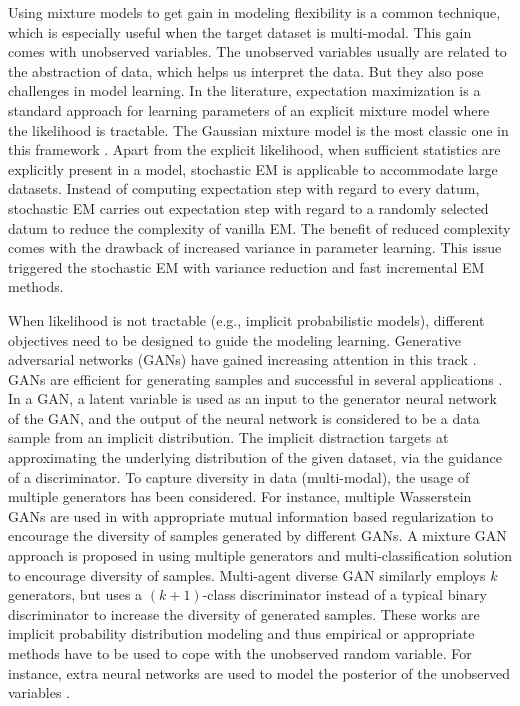 Using mixture models to get gain in modeling flexibility is a common technique, which is especially useful when the target dataset is multi-modal. This gain comes with unobserved variables. The unobserved variables usually are related to the abstraction of data, which helps us interpret the data. But they also pose challenges in model learning. In the literature, expectation maximization \cite{dempster1977maximum} is a standard approach for learning parameters of an explicit mixture model where the likelihood is tractable. The Gaussian mixture model is the most classic one in this framework \cite{Bishop:2006:PRM:1162264}.
Apart from the explicit likelihood, when sufficient statistics are explicitly present in a model, stochastic EM \cite{cappe2009sem} is applicable to accommodate large datasets. Instead of computing expectation step with regard to every datum, stochastic EM carries out expectation step with regard to a randomly selected datum to reduce the complexity of vanilla EM. The benefit of reduced complexity comes with the drawback of increased variance in parameter learning. This issue triggered the stochastic EM with variance reduction\cite{chen2018emvr} and fast incremental EM \cite{karimi2019incrementalEM} methods.


When likelihood is not tractable (e.g., implicit probabilistic models), different objectives need to be designed to guide the modeling learning. Generative adversarial networks (GANs) have gained increasing attention in this track \cite{NIPS2014_5423, NIPS2016_6125, 2018arXiv180508318Z, salimans2018improving}.
GANs are efficient for generating samples and successful in several applications \cite{ledig2017photo, NIPS2016_6125}. In a GAN, a latent variable is used as
an input to the generator neural network of the GAN, and the output of the neural network is considered to be a data sample from an implicit distribution. The implicit distraction targets at approximating the underlying distribution of the given dataset, via the guidance of a discriminator.
To capture diversity in data (multi-modal), the usage of multiple generators has been considered. For instance, multiple Wasserstein GANs \cite{2017arXiv170107875A} are used in \cite{2018arXiv180600880K} with appropriate mutual information based regularization to encourage the diversity of samples generated by different GANs.
A mixture GAN approach is proposed in \cite{hoang2018mgan} using multiple generators and multi-classification solution to
encourage diversity of samples. Multi-agent diverse GAN \cite{DBLP:journals/corr/GhoshKNTD17} similarly employs $k$ generators, but uses a $(k+1)$-class discriminator instead of a typical binary discriminator to increase the diversity of generated samples. These works are implicit probability distribution modeling and thus empirical or appropriate methods have to be used to cope with the unobserved random variable. For instance, extra neural networks are used to model the posterior of the unobserved variables \cite{donahue2017adversarial, dumoulin2017adversarially}. 


